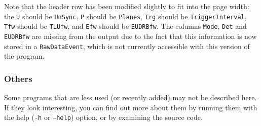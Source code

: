 Note that the header row has been modified slightly to fit into the page width:
the \texttt{U} should be \texttt{UnSync}, \texttt{P} should be \texttt{Planes},
\texttt{Trg} should be \texttt{TriggerInterval}, \texttt{Tfw} should be \texttt{TLUfw},
and \texttt{Efw} should be \texttt{EUDRBfw}.
The columns \texttt{Mode}, \texttt{Det} and \texttt{EUDRBfw} are missing from the output
due to the fact that this information is now stored in a \texttt{RawDataEvent},
which is not currently accessible with this version of the program.

\subsubsection{Others}
Some programs that are less used (or recently added)
may not be described here.
If they look interesting, you can find out more about them
by running them with the help (\texttt{-h} or \texttt{--help}) option,
or by examining the source code.
